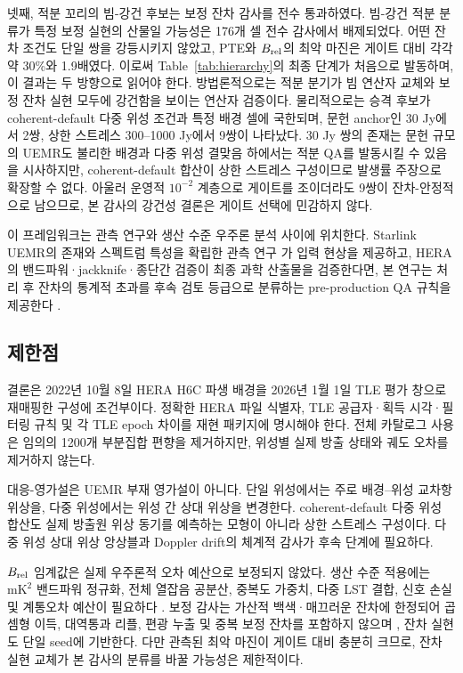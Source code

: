 \documentclass[final,5p,times]{elsarticle}
\newcommand{\NIntAuditPairsEtwo}{9}
\newcommand{\NIntAuditPairsMid}{2}
\newcommand{\NIntAuditCells}{176}
\begin{document}
넷째, 적분 꼬리의 빔-강건 후보는 보정 잔차 감사를 전수
통과하였다. 빔-강건 적분 분류가 특정 보정 실현의 산물일 가능성은
\NIntAuditCells{}개 셀 전수 감사에서 배제되었다. 어떤 잔차
조건도 단일 쌍을 강등시키지 않았고, PTE와 $B_{\rm rel}$의 최악
마진은 게이트 대비 각각 약 30\%와 1.9배였다. 이로써
Table~\ref{tab:hierarchy}의 최종 단계가 처음으로 발동하며, 이
결과는 두 방향으로 읽어야 한다. 방법론적으로는 적분 분기가 빔
연산자 교체와 보정 잔차 실현 모두에 강건함을 보이는 연산자
검증이다. 물리적으로는 승격 후보가 coherent-default 다중 위성
조건과 특정 배경 셀에 국한되며, 문헌 anchor인 30 Jy에서
\NIntAuditPairsMid{}쌍, 상한 스트레스 300--1000 Jy에서
\NIntAuditPairsEtwo{}쌍이 나타났다. 30 Jy 쌍의 존재는 문헌 규모의
UEMR도 불리한 배경과 다중 위성 결맞음 하에서는 적분 QA를 발동시킬
수 있음을 시사하지만, coherent-default 합산이 상한 스트레스
구성이므로 발생률 주장으로 확장할 수 없다. 아울러 운영적
$10^{-2}$ 계층으로 게이트를 조이더라도 \NIntAuditPairsEtwo{}쌍이
잔차-안정적으로 남으므로, 본 감사의 강건성 결론은 게이트 선택에
민감하지 않다.

이 프레임워크는 관측 연구와 생산 수준 우주론 분석 사이에 위치한다.
Starlink UEMR의 존재와 스펙트럼 특성을 확립한 관측 연구
\citep{divruno2023,bassa2024}가 입력 현상을 제공하고, HERA의
밴드파워·jackknife·종단간 검증이 최종 과학 산출물을 검증한다면,
본 연구는 처리 후 잔차의 통계적 초과를 후속 검토 등급으로 분류하는
pre-production QA 규칙을 제공한다
\citep{abdurashidova2022,wilensky2023jackknife}.

\subsection{제한점}

결론은 2022년 10월 8일 HERA H6C 파생 배경을 2026년 1월 1일 TLE
평가 창으로 재매핑한 구성에 조건부이다. 정확한 HERA 파일 식별자,
TLE 공급자·획득 시각·필터링 규칙 및 각 TLE epoch 차이를 재현
패키지에 명시해야 한다. 전체 카탈로그 사용은 임의의 1200개
부분집합 편향을 제거하지만, 위성별 실제 방출 상태와 궤도 오차를
제거하지 않는다.

대응-영가설은 UEMR 부재 영가설이 아니다. 단일 위성에서는 주로
배경--위성 교차항 위상을, 다중 위성에서는 위성 간 상대 위상을
변경한다. coherent-default 다중 위성 합산도 실제 방출원 위상 동기를
예측하는 모형이 아니라 상한 스트레스 구성이다. 다중 위성 상대 위상
앙상블과 Doppler drift의 체계적 감사가 후속 단계에 필요하다.

$B_{\rm rel}$ 임계값은 실제 우주론적 오차 예산으로 보정되지 않았다.
생산 수준 적용에는 $\mathrm{mK}^2$ 밴드파워 정규화, 전체 열잡음
공분산, 중복도 가중치, 다중 LST 결합, 신호 손실 및 계통오차 예산이
필요하다
\citep{cheng2018,aguirre2021validation,abdurashidova2022}.
보정 감사는 가산적 백색·매끄러운 잔차에 한정되어 곱셈형 이득,
대역통과 리플, 편광 누출 및 중복 보정 잔차를 포함하지 않으며
\citep{barry2016,ewallwice2017,dillon2020redcal,kim2023beamvar},
잔차 실현도 단일 seed에 기반한다. 다만 관측된 최악 마진이 게이트
대비 충분히 크므로, 잔차 실현 교체가 본 감사의 분류를 바꿀
가능성은 제한적이다.
\end{document}

